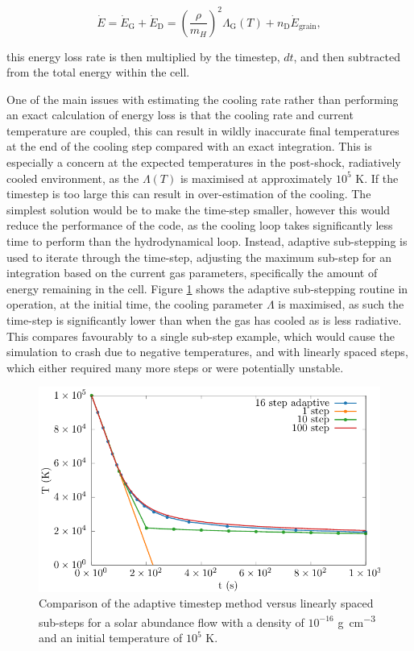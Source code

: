 \begin{equation}
  \dot E = \dot{E}_\text{G} + \dot{E}_\text{D} = \left(\frac{\rho}{m_H}\right)^2 \Lambda_\text{G}(T) + n_\text{D} \dot{E}_\text{grain},
\end{equation}

\noindent
this energy loss rate is then multiplied by the timestep, $dt$, and then subtracted from the total energy within the cell. 


One of the main issues with estimating the cooling rate rather than performing an exact calculation of energy loss is that the cooling rate and current temperature are coupled, this can result in wildly inaccurate final temperatures at the end of the cooling step compared with an exact integration.
This is especially a concern at the expected temperatures in the post-shock, radiatively cooled environment, as the $\Lambda(T)$ is maximised at approximately $10^5$ \si{\kelvin}. If the timestep is too large this can result in over-estimation of the cooling.
The simplest solution would be to make the time-step smaller, however this would reduce the performance of the code, as the cooling loop takes significantly less time to perform than the hydrodynamical loop.
Instead, adaptive sub-stepping is used to iterate through the time-step, adjusting the maximum sub-step for an integration based on the current gas parameters, specifically the amount of energy remaining in the cell.
Figure \ref{fig:cooling-loop-evolution} shows the adaptive sub-stepping routine in operation, at the initial time, the cooling parameter $\Lambda$ is maximised, as such the time-step is significantly lower than when the gas has cooled as is less radiative.
This compares favourably to a single sub-step example, which would cause the simulation to crash due to negative temperatures, and with linearly spaced steps, which either required many more steps or were potentially unstable.

\begin{figure}
  \centering
  \includegraphics{assets/plasma-cooling-benchmarks/evolution.pdf}
  \caption[Cooling sub-step method evolution comparison]{Comparison of the adaptive timestep method versus linearly spaced sub-steps for a solar abundance flow with a density of $10^{-16}$ \si{\gram\per\centi\metre\cubed} and an initial temperature of $10^5$ \si{\kelvin}.}
  \label{fig:cooling-loop-evolution}
\end{figure}

